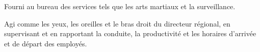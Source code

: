 \begin{achievements}
	\item Fourni au bureau des services tels que les arts martiaux et la surveillance.
	\item Agi comme les yeux, les oreilles et le bras droit du directeur régional, en supervisant et en rapportant la conduite, la productivité et les horaires d’arrivée et de départ des employés.
\end{achievements}
